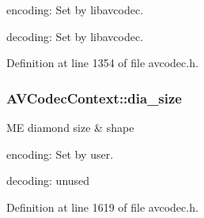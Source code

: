 \begin{DoxyItemize}
\item encoding\+: Set by libavcodec.
\item decoding\+: Set by libavcodec. 
\end{DoxyItemize}

Definition at line 1354 of file avcodec.\+h.

\subsubsection[{\texorpdfstring{dia\+\_\+size}{dia_size}}]{ A\+V\+Codec\+Context\+::dia\+\_\+size}\hypertarget{struct_a_v_codec_context_a41fe8a6a05a20ef02eb49a46f774fb2b}{}\label{struct_a_v_codec_context_a41fe8a6a05a20ef02eb49a46f774fb2b}
ME diamond size \& shape
\begin{DoxyItemize}
\item encoding\+: Set by user.
\item decoding\+: unused 
\end{DoxyItemize}

Definition at line 1619 of file avcodec.\+h.

